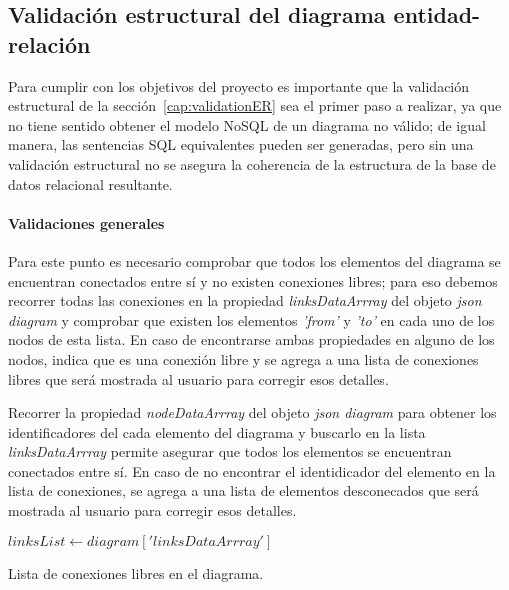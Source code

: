 \subsection{Validación estructural del diagrama entidad-relación}

Para cumplir con los objetivos del proyecto es importante que la validación estructural de la sección~\ref{cap:validationER} sea el primer paso a realizar, ya que no tiene sentido obtener el modelo NoSQL de un diagrama no válido; de igual manera, las sentencias SQL equivalentes pueden ser generadas, pero sin una validación estructural no se asegura la coherencia de la estructura de la base de datos relacional resultante.

\paragraph*{Validaciones generales}

Para este punto es necesario comprobar que todos los elementos del diagrama se encuentran conectados entre sí y no existen conexiones libres; para eso debemos recorrer todas las conexiones en la propiedad \textit{linksDataArrray} del objeto \textit{json diagram} y comprobar que existen los elementos \textit{'from'} y \textit{'to'} en cada uno de los nodos de esta lista. En caso de encontrarse ambas propiedades en alguno de los nodos, indica que es una conexión libre y se agrega a una lista de conexiones libres que será mostrada al usuario para corregir esos detalles.

Recorrer la propiedad \textit{nodeDataArrray} del objeto \textit{json diagram} para obtener los identificadores del cada elemento del diagrama y buscarlo en la lista \textit{linksDataArrray} permite asegurar que todos los elementos se encuentran conectados entre sí. En caso de no encontrar el identidicador del elemento en la lista de conexiones, se agrega a una lista de elementos desconecados que será mostrada al usuario para corregir esos detalles.


\begin{algorithm}[H]

  $linksList \gets diagram['linksDataArrray']$\\
  
  \caption{Lista de conexiones libres en el diagrama.}
\end{algorithm}

